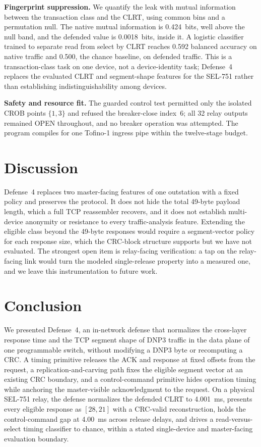 \noindent\textbf{Fingerprint suppression.} We quantify the leak with mutual information between the
transaction class and the CLRT, using common bins and a permutation null. The native mutual information
is 0.424~bits, well above the null band, and the defended value is 0.0018~bits, inside it. A logistic
classifier trained to separate read from select by CLRT reaches 0.592 balanced accuracy on native
traffic and 0.500, the chance baseline, on defended traffic. This is a transaction-class task on one
device, not a device-identity task; Defense~4 replaces the evaluated CLRT and segment-shape features
for the SEL-751 rather than establishing indistinguishability among devices.

\noindent\textbf{Safety and resource fit.} The guarded control test permitted only the isolated CROB
points $\{1,3\}$ and refused the breaker-close index~6; all 32 relay outputs remained OPEN throughout,
and no breaker operation was attempted. The program compiles for one Tofino-1 ingress pipe within the
twelve-stage budget.

\section{Discussion}
\label{sec:disc}

Defense~4 replaces two master-facing features of one outstation with a fixed policy and preserves the
protocol. It does not hide the total 49-byte payload length, which a full TCP reassembler recovers,
and it does not establish multi-device anonymity or resistance to every traffic-analysis feature.
Extending the eligible class beyond the 49-byte responses would require a segment-vector policy for
each response size, which the CRC-block structure supports but we have not evaluated. The strongest
open item is relay-facing verification: a tap on the relay-facing link would turn the modeled
single-release property into a measured one, and we leave this instrumentation to future work.

\section{Conclusion}
\label{sec:concl}

We presented Defense~4, an in-network defense that normalizes the cross-layer response time and the
TCP segment shape of DNP3 traffic in the data plane of one programmable switch, without modifying a
DNP3 byte or recomputing a CRC. A timing primitive releases the ACK and response at fixed offsets from
the request, a replication-and-carving path fixes the eligible segment vector at an existing CRC
boundary, and a control-command primitive hides operation timing while anchoring the master-visible
acknowledgment to the request. On a physical SEL-751 relay, the defense normalizes the defended CLRT to
4.001~ms, presents every eligible response as $[28,21]$ with a CRC-valid reconstruction, holds the
control-command gap at 4.00~ms across release delays, and drives a read-versus-select timing classifier
to chance, within a stated single-device and master-facing evaluation boundary.
